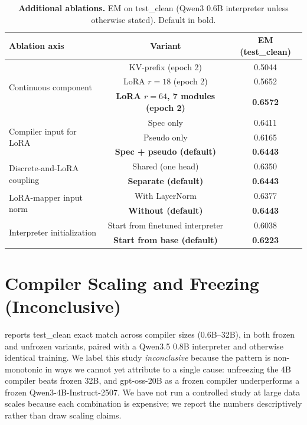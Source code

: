 \begin{table}[!h]
\centering
\caption{\label{tab:ablations_full}\textbf{Additional ablations.} EM on test\_clean (Qwen3 0.6B interpreter unless otherwise stated). Default in bold.}
\small
\setlength{\tabcolsep}{6pt}
\begin{tabular}{@{}lcc@{}}
\toprule
Ablation axis & Variant & EM (test\_clean) \\
\midrule
\multirow{3}{*}{Continuous component}
  & KV-prefix (epoch 2)                & 0.5044 \\
  & LoRA $r{=}18$ (epoch 2)            & 0.5652 \\
  & \textbf{LoRA $r{=}64$, 7 modules (epoch 2)} & \textbf{0.6572} \\
\midrule
\multirow{3}{*}{Compiler input for LoRA}
  & Spec only                          & 0.6411 \\
  & Pseudo only                        & 0.6165 \\
  & \textbf{Spec + pseudo (default)}   & \textbf{0.6443} \\
\midrule
\multirow{2}{*}{Discrete-and-LoRA coupling}
  & Shared (one head)                  & 0.6350 \\
  & \textbf{Separate (default)}        & \textbf{0.6443} \\
\midrule
\multirow{2}{*}{LoRA-mapper input norm}
  & With LayerNorm                     & 0.6377 \\
  & \textbf{Without (default)}         & \textbf{0.6443} \\
\midrule
\multirow{2}{*}{Interpreter initialization}
  & Start from finetuned interpreter   & 0.6038 \\
  & \textbf{Start from base (default)} & \textbf{0.6223} \\
\bottomrule
\end{tabular}
\end{table}


\section{Compiler Scaling and Freezing (Inconclusive)}
\label{appendix:compiler_scaling}

 reports test\_clean exact match across compiler sizes (0.6B--32B), in both frozen and unfrozen variants, paired with a Qwen3.5 0.8B interpreter and otherwise identical training. We label this study \emph{inconclusive} because the pattern is non-monotonic in ways we cannot yet attribute to a single cause: unfreezing the 4B compiler beats frozen 32B, and gpt-oss-20B as a frozen compiler underperforms a frozen Qwen3-4B-Instruct-2507. We have not run a controlled study at large data scales because each combination is expensive; we report the numbers descriptively rather than draw scaling claims.

